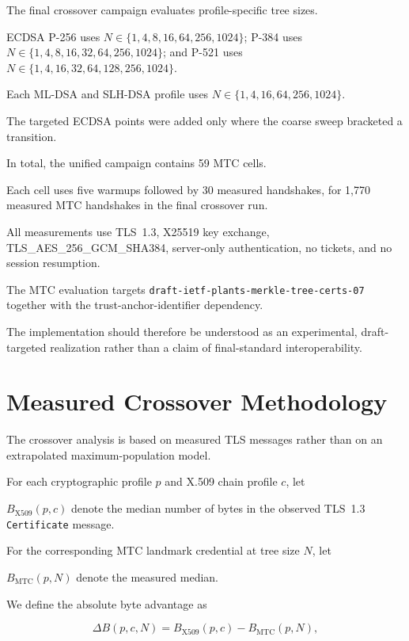 \documentclass[journal]{IEEEtran}
\begin{document}
The final crossover campaign evaluates profile-specific tree sizes.

ECDSA P-256 uses $N\in\{1,4,8,16,64,256,1024\}$; P-384 uses $N\in\{1,4,8,16,32,64,256,1024\}$; and P-521 uses $N\in\{1,4,16,32,64,128,256,1024\}$.

Each ML-DSA and SLH-DSA profile uses $N\in\{1,4,16,64,256,1024\}$.

The targeted ECDSA points were added only where the coarse sweep bracketed a transition.

In total, the unified campaign contains 59 MTC cells.

Each cell uses five warmups followed by 30 measured handshakes, for 1,770 measured MTC handshakes in the final crossover run.



All measurements use TLS~1.3, X25519 key exchange, TLS\_AES\_256\_GCM\_SHA384, server-only authentication, no tickets, and no session resumption.

The MTC evaluation targets \texttt{draft-ietf-plants-merkle-tree-certs-07} together with the trust-anchor-identifier dependency.

The implementation should therefore be understood as an experimental, draft-targeted realization rather than a claim of final-standard interoperability.



\section{Measured Crossover Methodology}

\label{sec:crossover-method}



The crossover analysis is based on measured TLS messages rather than on an extrapolated maximum-population model.

For each cryptographic profile $p$ and X.509 chain profile $c$, let

$B_{\mathrm{X509}}(p,c)$ denote the median number of bytes in the observed TLS~1.3 \texttt{Certificate} message.

For the corresponding MTC landmark credential at tree size $N$, let

$B_{\mathrm{MTC}}(p,N)$ denote the measured median.



We define the absolute byte advantage as

\begin{equation}
\Delta B(p,c,N)=B_{\mathrm{X509}}(p,c)-B_{\mathrm{MTC}}(p,N),
\end{equation}
\end{document}
